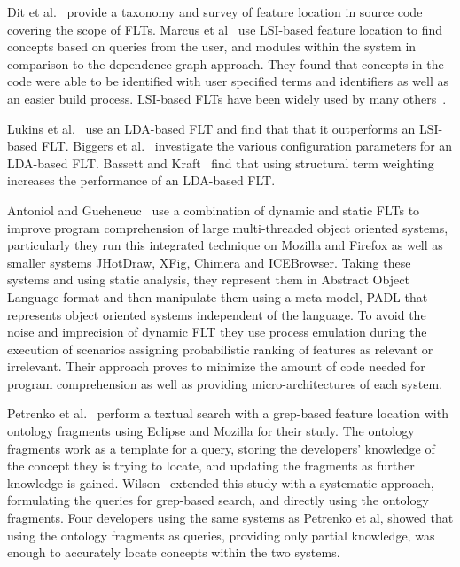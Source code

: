 Dit et al.~\cite{Dit-etal:2013b} provide a taxonomy and survey of feature
location in source code covering the scope of FLTs.  Marcus et
al~\cite{Marcus-etal:2004} use LSI-based feature location to find concepts based
on queries from the user, and modules within the system in comparison to the
dependence graph approach. They found that concepts in the code were able to be
identified with user specified terms and identifiers as well as an easier build
process. LSI-based FLTs have been widely used by many others~\cite{
Poshyvanyk-etal:2006, Poshyvanyk-Marcus:2007, Liu-etal:2007,
Scanniello-Marcus:2011, Eaddy-etal:2008, Cubranic-etal:2005}.

Lukins et al.~\cite{Lukins-etal:2008} use an LDA-based FLT and find that that it
outperforms an LSI-based FLT.  Biggers et al.~\cite{Biggers-etal:2014}
investigate the various configuration parameters for an LDA-based FLT.  Bassett
and Kraft~\cite{Bassett-Kraft:2013} find that using structural term weighting
increases the performance of an LDA-based FLT.

Antoniol and Gueheneuc~\cite{Antoniol-Gueheneuc:2005, Antoniol-Gueheneuc:2006}
use a combination of dynamic and static FLTs to improve program comprehension of
large multi-threaded object oriented systems, particularly they run this
integrated technique on Mozilla and Firefox as well as smaller systems JHotDraw,
XFig, Chimera and ICEBrowser. Taking these systems and using static analysis,
they represent them in Abstract Object Language format and then manipulate them
using a meta model, PADL that represents object oriented systems independent of
the language. To avoid the noise and imprecision of dynamic FLT they use process
emulation during the execution of scenarios assigning probabilistic ranking of
features as relevant or irrelevant. Their approach proves to minimize the amount
of code needed for program comprehension as well as providing
micro-architectures of each system.

Petrenko et al.~\cite{Petrenko-etal:2008} perform a textual search with
a grep-based feature location with ontology fragments using Eclipse and Mozilla
for their study. The ontology fragments work as a template for a query, storing
the developers' knowledge of the concept they is trying to locate, and updating
the fragments as further knowledge is gained. Wilson~\cite{Wilson:2010} extended
this study with a systematic approach, formulating the queries for grep-based
search, and directly using the ontology fragments. Four developers using the
same systems as Petrenko et al, showed that using the ontology fragments as
queries, providing only partial knowledge, was enough to accurately locate
concepts within the two systems.

